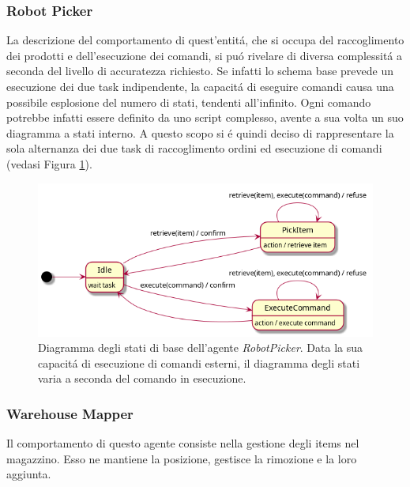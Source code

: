 \subsubsection{Robot Picker}
La descrizione del comportamento di quest'entit\'a, che si occupa del raccoglimento dei prodotti e dell'esecuzione dei comandi, si pu\'o rivelare di diversa complessit\'a a seconda del livello di accuratezza richiesto. Se infatti lo schema base prevede un esecuzione dei due task indipendente, la capacit\'a di eseguire comandi causa una possibile esplosione del numero di stati, tendenti all'infinito. Ogni comando potrebbe infatti essere definito da uno script complesso, avente a sua volta un suo diagramma a stati interno. A questo scopo si \'e quindi deciso di rappresentare la sola alternanza dei due task di raccoglimento ordini ed esecuzione di comandi (vedasi Figura \ref{fig:rp-state-diagram}).
\begin{figure}[!ht]\centering
    \includegraphics[width=\textwidth]{section/design/figure/robot_picker/state_diagram.png}
    \caption{Diagramma degli stati di base dell'agente \textit{RobotPicker}. Data la sua capacit\'a di esecuzione di comandi esterni, il diagramma degli stati varia a seconda del comando in esecuzione.}
    \label{fig:rp-state-diagram}
\end{figure}

\subsubsection{Warehouse Mapper}
Il comportamento di questo agente consiste nella gestione degli items nel magazzino. Esso ne mantiene la posizione, gestisce la rimozione e la loro aggiunta.

